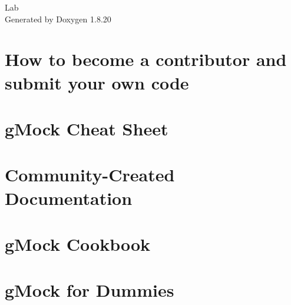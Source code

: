 \let\mypdfximage\pdfximage\def\pdfximage{\immediate\mypdfximage}\documentclass[twoside]{book}
\newcommand{\+}{\discretionary{\mbox{\scriptsize$\hookleftarrow$}}{}{}}
\newcommand{\clearemptydoublepage}{%
  \newpage{\pagestyle{empty}\cleardoublepage}%
}
\begin{document}
\hypersetup{pageanchor=false,
             bookmarksnumbered=true,
             pdfencoding=unicode
            }
\begin{titlepage}
\vspace*{7cm}
\begin{center}%
{\Large Lab }\\
\vspace*{1cm}
{\large Generated by Doxygen 1.8.20}\\
\end{center}
\end{titlepage}
\clearemptydoublepage
{}
\tableofcontents
\clearemptydoublepage
{}
\hypersetup{pageanchor=true}

\chapter{How to become a contributor and submit your own code}
\label{md_lib_googletest-master__c_o_n_t_r_i_b_u_t_i_n_g}

\chapter{g\+Mock Cheat Sheet}
\label{md_lib_googletest-master_googlemock_docs_cheat_sheet}

\chapter{Community-\/\+Created Documentation}
\label{md_lib_googletest-master_googlemock_docs_community_created_documentation}

\chapter{g\+Mock Cookbook}
\label{md_lib_googletest-master_googlemock_docs_cook_book}

\chapter{g\+Mock for Dummies}
\label{_g_mock_for_dummies}

\end{document}

